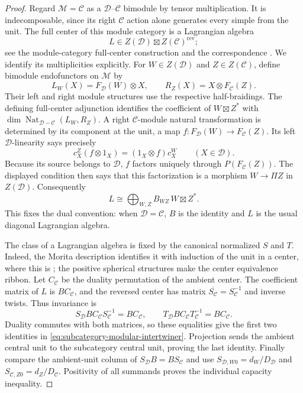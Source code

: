 \begin{proof}
Regard $\mathcal M=\mathcal C$ as a
$\mathcal D$--$\mathcal C$ bimodule by tensor multiplication.
It is indecomposable, since its right $\mathcal C$ action alone generates
every simple from the unit. The full center of this module category is a
Lagrangian algebra
\[
 L\in Z(\mathcal D)\boxtimes Z(\mathcal C)^{\mathrm{rev}};
\]
see the module-category full-center construction
\cite[Section~6, Theorem~6.2]{DavydovCentre} and the correspondence
\cite[Proposition~4.8]{DMNO}. We identify its multiplicities explicitly.
For $W\in Z(\mathcal D)$ and $Z\in Z(\mathcal C)$, define bimodule
endofunctors on $\mathcal M$ by
\[
 L_W(X)=F_{\mathcal D}(W)\otimes X,
 \qquad R_Z(X)=X\otimes F_{\mathcal C}(Z).
\]
Their left and right module structures use the respective half-braidings.
The defining full-center adjunction identifies the coefficient of
$W\boxtimes Z^*$ with
$\dim\operatorname{Nat}_{\mathcal D-\mathcal C}(L_W,R_Z)$.
A right $\mathcal C$-module natural transformation is determined by its
component at the unit, a map
$f:F_{\mathcal D}(W)\to F_{\mathcal C}(Z)$.
Its left $\mathcal D$-linearity says precisely
\[
 c^Z_X(f\otimes1_X)=(1_X\otimes f)c^W_X
       \qquad(X\in\mathcal D).
\]
Because its source belongs to $\mathcal D$, $f$ factors uniquely through
$P(F_{\mathcal C}(Z))$. The displayed condition then says that this
factorization is a morphism $W\to\Pi Z$ in $Z(\mathcal D)$.
Consequently
\[
 L\cong\bigoplus_{W,Z}B_{WZ}\,W\boxtimes Z^*.
\]
This fixes the dual convention: when $\mathcal D=\mathcal C$, $B$ is the
identity and $L$ is the usual diagonal Lagrangian algebra.

The class of a Lagrangian algebra is fixed by the canonical normalized
$S$ and $T$. Indeed, the Morita description identifies it with induction
of the unit in a center, where this is
\cite[Theorem~2.5, Proposition~2.8]{Ostrik3}; the positive spherical
structures make the center equivalence ribbon. Let $C_{\mathcal C}$ be
the duality permutation of the ambient center. The coefficient matrix
of $L$ is $BC_{\mathcal C}$, and the reversed center has matrix
$\overline{S_{\mathcal C}}=S_{\mathcal C}^{-1}$ and inverse twists.
Thus invariance is
\[
 S_{\mathcal D}BC_{\mathcal C}S_{\mathcal C}^{-1}
       =BC_{\mathcal C},\qquad
 T_{\mathcal D}BC_{\mathcal C}T_{\mathcal C}^{-1}
       =BC_{\mathcal C}.
\]
Duality commutes with both matrices, so these equalities give the first
two identities in \eqref{eq:subcategory-modular-intertwiner}.
Projection sends the ambient central unit to the subcategory central
unit, proving the last identity. Finally compare the ambient-unit column
of $S_{\mathcal D}B=BS_{\mathcal C}$ and use
$S_{\mathcal D,W0}=d_W/D_{\mathcal D}$ and
$S_{\mathcal C,Z0}=d_Z/D_{\mathcal C}$.
Positivity of all summands proves the individual capacity inequality.
\end{proof}

